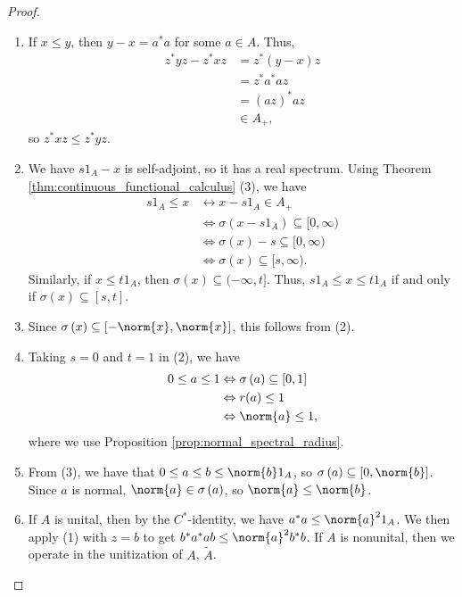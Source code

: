 \begin{proof}\hfill
  \begin{enumerate}[(1)]
    \item If $x\leq y$, then $y-x = a^{\ast}a$ for some $a\in A$. Thus,
      \begin{align*}
        z^{\ast}yz - z^{\ast}xz &= z^{\ast}\left( y-x \right)z\\
                                &= z^{\ast}a^{\ast}az\\
                                &= \left( az \right)^{\ast}az\\
                                &\in A_{+},
      \end{align*}
      so $z^{\ast}xz \leq z^{\ast}yz$.
    \item We have $s1_A - x$ is self-adjoint, so it has a real spectrum. Using Theorem \ref{thm:continuous_functional_calculus} (3), we have
      \begin{align*}
        s1_A \leq x &\leftrightarrow x-s1_A \in A_{+}\\
                    &\Leftrightarrow \sigma\left( x-s1_A \right)\subseteq [0,\infty)\\
                    &\Leftrightarrow \sigma\left( x \right)-s \subseteq [0,\infty)\\
                    &\Leftrightarrow \sigma\left( x \right)\subseteq [s,\infty).
      \end{align*}
      Similarly, if $x\leq t1_A$, then $\sigma\left( x \right)\subseteq (-\infty,t]$. Thus, $s1_A \leq x \leq t1_A$ if and only if $\sigma\left( x \right)\subseteq [s,t]$.
    \item Since $\sigma\left( x \right)\subseteq \left[-\norm{x},\norm{x}\right]$, this follows from (2).
    \item Taking $s = 0$ and $t = 1$ in (2), we have
      \begin{align*}
        0\leq a \leq 1 &\Leftrightarrow \sigma\left( a \right)\subseteq [0,1]\\
                       &\Leftrightarrow r(a)\leq 1\\
                       &\Leftrightarrow \norm{a}\leq 1,
      \end{align*}
      where we use Proposition \ref{prop:normal_spectral_radius}.
    \item From (3), we have that $0\leq a \leq b \leq \norm{b}1_A$, so $\sigma\left( a \right)\subseteq [0,\norm{b}]$. Since $a$ is normal, $\norm{a}\in \sigma\left( a \right)$, so $\norm{a}\leq \norm{b}$.
    \item If $A$ is unital, then by the $C^{\ast}$-identity, we have $a^{\ast}a\leq \norm{a}^21_A$. We then apply (1) with $z = b$ to get $b^{\ast}a^{\ast}ab \leq \norm{a}^2b^{\ast}b$. If $A$ is nonunital, then we operate in the unitization of $A$, $\widetilde{A}$.
  \end{enumerate}
\end{proof}
